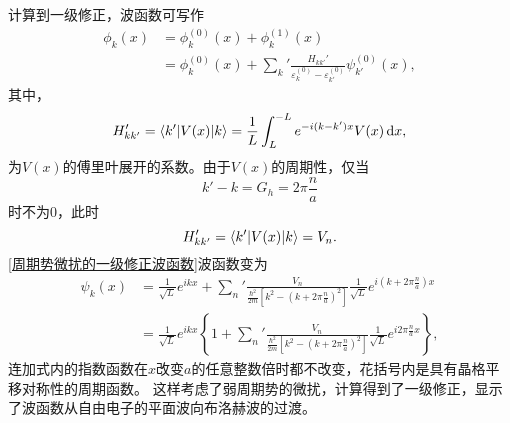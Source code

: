             计算到一级修正，波函数可写作
            \begin{equation}
                \begin{aligned}
                    \phi_k(x)&=\phi_k^{(0)}(x)+\phi_k^{(1)}(x)\\
                    &= \phi_k^{(0)}(x)+\sum_{k}{}'\frac{H_{kk'}'}{\varepsilon_k^{(0)}-\varepsilon_{k'}^{(0)}}\psi_{k'}^{(0)}(x),                
                \end{aligned}\label{周期势微扰的一级修正波函数}
            \end{equation}
            其中，
            \begin{equation}
                H'_{kk'}=\mathinner{\langle{k'|V(x)|k}\rangle}=\frac{1}{L}\int_{L}^{-L}e^{-i(k-k')x}V(x)\mathop{}\!\mathrm{d} x,
            \end{equation}
            为$V(x)$的傅里叶展开的系数。由于$V(x)$的周期性，仅当
            \begin{equation}
                k'-k=G_h=2\pi\frac{n}{a}\label{周期性微扰哈密顿矩阵元不为零的情况}
            \end{equation}
            时不为0，此时
            \begin{equation}
                H'_{kk'}=\mathinner{\langle{k'|V(x)|k}\rangle}=V_n\label{周期性微扰哈密顿量与微扰势关系}.
            \end{equation}
            \autoref{周期势微扰的一级修正波函数}波函数变为
            \begin{equation}
                \begin{aligned}
                    \psi_k(x)&=\frac{1}{\sqrt{L}}e^{ikx}+\sum_n{}'\frac{V_n}{\frac{\hbar^2}{2m}\left[ k^2-\left( k+2\pi\frac{n}{a} \right)^2 \right]}\frac{1}{\sqrt{L}}e^{i\left( k+2\pi \frac{n}{a}\right)x}\\
                    &=\frac{1}{\sqrt{L}}e^{ikx}\left\{ 1+\sum_n{}'\frac{V_n}{\frac{\hbar^2}{2m}\left[ k^2-\left( k+2\pi\frac{n}{a} \right)^2 \right]}\frac{1}{\sqrt{L}}e^{i2\pi \frac{n}{a}x}\right\},
                \end{aligned}
            \end{equation}
            连加式内的指数函数在$x$改变$a$的任意整数倍时都不改变，花括号内是具有晶格平移对称性的周期函数。
            这样考虑了弱周期势的微扰，计算得到了一级修正，显示了波函数从自由电子的平面波向布洛赫波的过渡。

